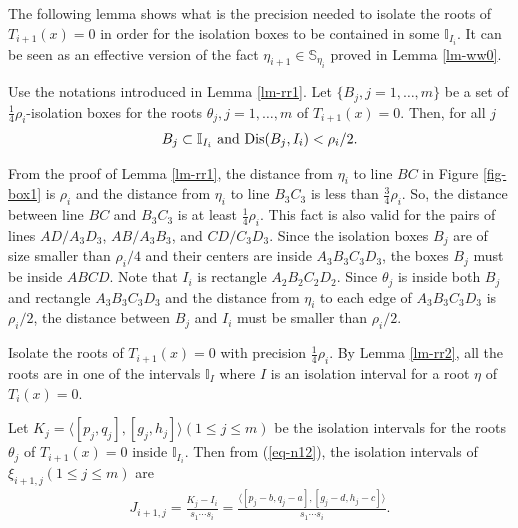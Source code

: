 \documentclass[amsthm]{JSC_LaTex_2007_Mar_12/elsart}
\def\bref#1{(\ref{#1})}
\def\Dis{\hbox{\rm{Dis}}}
\begin{document}
The following lemma shows what is the precision needed to isolate
the roots of $T_{i+1}(x)=0$ in order for the isolation boxes to be
contained in some $\mathbb{I}_{I_i}$. It can be seen as an effective
version of the fact $\eta_{i+1}\in \mathbb{S}_{\eta_i}$ proved in
Lemma \ref{lm-ww0}.
\begin{lem}\label{lm-rr2}
Use the notations introduced in Lemma \ref{lm-rr1}. Let $\{ B_j,
j=1,\ldots,m \}$ be a set of $\frac{1}{4}\rho_i$-isolation boxes for
the roots $\theta_j, j=1,\ldots,m$ of $T_{i+1}(x)=0$. Then, for all
$j$
\begin{eqnarray}\label{eq-rr2}
B_j\subset\mathbb{I}_{I_i} \hbox{ and } \Dis(B_j,I_i) < \rho_i/2.
\end{eqnarray}
\end{lem}
\begin{pf}
From the proof of Lemma \ref{lm-rr1},  the distance from $\eta_i$ to
line $BC$ in Figure \ref{fig-box1} is $\rho_i$ and the distance from
$\eta_i$ to line $B_3C_3$ is less than $\frac{3}{4}\rho_i$. So, the
distance between line $BC$ and $B_3C_3$ is at least
$\frac{1}{4}\rho_i$. This fact is also valid for the pairs of lines
$AD/A_3D_3$, $AB/A_3B_3$, and $CD/C_3D_3$. Since the isolation boxes
$B_j$ are of size smaller than $\rho_i/4$ and their centers are
inside $A_3B_3C_3D_3$, the boxes $B_j$ must be inside $ABCD$.
Note that $I_i$ is rectangle $A_2B_2C_2D_2$. Since $\theta_j$ is
inside both $B_j$ and rectangle $A_3B_3C_3D_3$ and the distance from
$\eta_i$ to each edge of $A_3B_3C_3D_3$ is $\rho_i/2$, the distance
between  $B_j$ and $I_i$ must be smaller than $\rho_i/2$.
\end{pf}

Isolate the roots of $T_{i+1}(x)=0$ with precision
$\frac{1}{4}\rho_i$. By Lemma \ref{lm-rr2}, all the roots are in one
of the intervals $\mathbb{I}_{I}$ where $I$ is an isolation interval
for a root $\eta$ of $T_i(x)=0$.

Let $K_j=\langle[p_j,q_j],[g_j,h_j]\rangle(1\le j\le m)$ be the
isolation intervals for the roots $\theta_j$ of $T_{i+1}(x)=0$
inside $\mathbb{I}_{I_i}$.
Then from \bref{eq-n12}, the isolation intervals of
$\xi_{i+1,j}(1\le j\le m)$ are
\begin{eqnarray}\label{eq-inti}J_{i+1,j}=\frac{K_j - I_i}{s_1\cdots s_i}=\frac{\langle[p_j-b,q_j-a],[g_j-d,h_j-c]\rangle}{s_1\cdots s_i}. \end{eqnarray}
\end{document}
